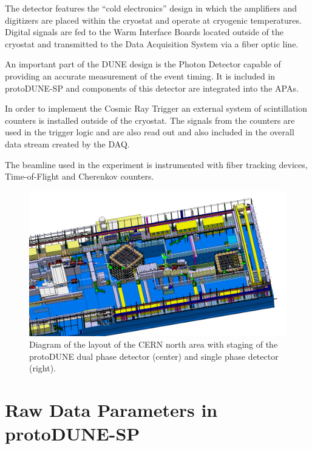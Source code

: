 \documentclass{PoS}
\begin{document}
The detector features the ``cold electronics'' design
in which the amplifiers and digitizers are placed within the cryostat and operate at
cryogenic temperatures. Digital signals are fed to the Warm Interface Boards located
outside of the cryostat and transmitted to the Data Acquisition System via a fiber
optic line.

An important part of the DUNE design is the Photon Detector capable of providing an accurate measurement
of the event timing. It is included in protoDUNE-SP and components of this detector are integrated
into the APAs.

In order to implement the Cosmic Ray Trigger an external system of scintillation counters is installed
outside of the cryostat. The signals from the counters are used in the trigger logic and are also
read out and also included in the overall data stream created by the DAQ.

The beamline used in the experiment is instrumented with fiber tracking devices, Time-of-Flight and Cherenkov counters.




\begin{figure}[tb]
\centering\includegraphics[width=1.0\textwidth]{np02np04.png}
\caption{\label{fig:np02np04}Diagram of the layout of the CERN north area with
  staging of the protoDUNE dual phase detector (center) and single
  phase detector (right).}
\end{figure}

\section{Raw Data Parameters in protoDUNE-SP}
\label{sec:np04_data_rate}
\end{document}
